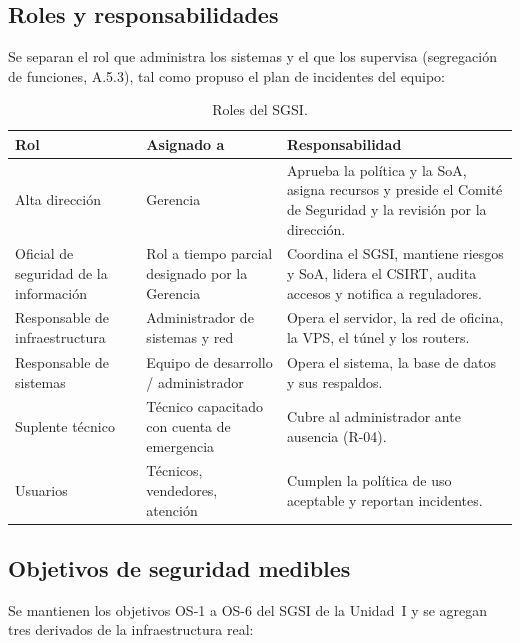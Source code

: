\subsection{Roles y responsabilidades}

Se separan el rol que administra los sistemas y el que los supervisa (segregación de
funciones, A.5.3), tal como propuso el plan de incidentes del equipo:

\begin{table}[htbp]
\centering
\caption{Roles del SGSI.}
\label{tab:ce03-sgsi-roles}
\small
\begin{tabularx}{\textwidth}{L{3.6cm}L{3cm}X}
\toprule
\textbf{Rol} & \textbf{Asignado a} & \textbf{Responsabilidad} \\
\midrule
Alta dirección & Gerencia & Aprueba la política y la SoA, asigna recursos y preside el Comité de Seguridad y la revisión por la dirección. \\
Oficial de seguridad de la información & Rol a tiempo parcial designado por la Gerencia & Coordina el SGSI, mantiene riesgos y SoA, lidera el CSIRT, audita accesos y notifica a reguladores. \\
Responsable de infraestructura & Administrador de sistemas y red & Opera el servidor, la red de oficina, la VPS, el túnel y los routers. \\
Responsable de sistemas & Equipo de desarrollo / administrador & Opera el sistema, la base de datos y sus respaldos. \\
Suplente técnico & Técnico capacitado con cuenta de emergencia & Cubre al administrador ante ausencia (R-04). \\
Usuarios & Técnicos, vendedores, atención & Cumplen la política de uso aceptable y reportan incidentes. \\
\bottomrule
\end{tabularx}
\end{table}

\subsection{Objetivos de seguridad medibles}

Se mantienen los objetivos OS-1 a OS-6 del SGSI de la Unidad~I y se agregan tres derivados
de la infraestructura real:

